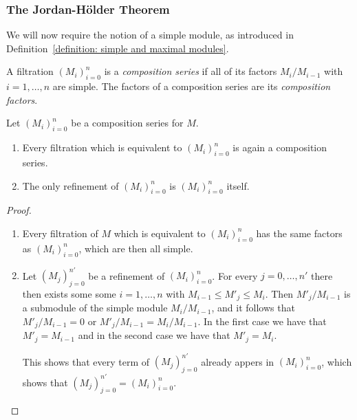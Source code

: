 \subsubsection{The Jordan-Hölder Theorem}


\begin{fluff}
  We will now require the notion of a simple module, as introduced in Definition~\ref{definition: simple and maximal modules}.
\end{fluff}


\begin{definition}
  \label{definition: composition series}
  A filtration $(M_i)_{i=0}^n$ is a \emph{composition series} if all of its factors $M_i/M_{i-1}$ with $i = 1, \dotsc, n$ are simple.
  The factors of a composition series are its \emph{composition factors}.
\end{definition}


\begin{lemma}
  \label{lemma: preparation for jordan hoelder}
  Let $(M_i)_{i=0}^n$ be a composition series for $M$.
  \begin{enumerate}
    \item
      Every filtration which is equivalent to $(M_i)_{i=0}^n$ is again a composition series.
    \item
      The only refinement of $(M_i)_{i=0}^n$ is $(M_i)_{i=0}^n$ itself.
  \end{enumerate}
\end{lemma}


\begin{proof}
  \leavevmode
  \begin{enumerate}
    \item
      Every filtration of $M$ which is equivalent to $(M_i)_{i=0}^n$ has the same factors as $(M_i)_{i=0}^n$, which are then all simple.
    \item
      Let $(M_j)_{j=0}^{n'}$ be a refinement of $(M_i)_{i=0}^n$.
      For every $j = 0, \dotsc, n'$ there then exists some some $i = 1, \dotsc, n$ with $M_{i-1} \leq M'_j \leq M_i$.
      Then $M'_j/M_{i-1}$ is a submodule of the simple module $M_i/M_{i-1}$, and it follows that $M'_j/M_{i-1} = 0$ or $M'_j/M_{i-1} = M_i/M_{i-1}$.
      In the first case we have that $M'_j = M_{i-1}$ and in the second case we have that $M'_j = M_i$.
      
      This shows that every term of $(M_j)_{j=0}^{n'}$ already appers in $(M_i)_{i=0}^n$, which shows that $(M_j)_{j=0}^{n'} = (M_i)_{i=0}^n$.
    \qedhere
  \end{enumerate}
\end{proof}



